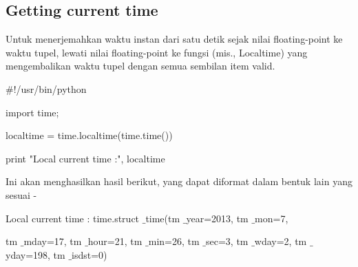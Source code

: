 \documentclass[a4paper,12pt]{report}
\begin{document}
\vspace{20pt}
\vspace{20pt}
\subsection*{Getting current time}
 \par
\begin{adjustwidth}{0.03in}{0.03in}
 \hspace*{0.5in} Untuk menerjemahkan waktu instan dari satu detik sejak nilai floating-point ke waktu tupel, lewati nilai floating-point ke fungsi (mis., Localtime) yang mengembalikan waktu tupel dengan semua sembilan item valid.\end{adjustwidth}
 \par
\vspace{12pt}
\noindent 
 \hspace*{0.5in}  $  \#  $!/usr/bin/python \par
\noindent 
 \hspace*{0.5in} import time; \par
\vspace{12pt}
\noindent 
 \hspace*{0.5in} localtime = time.localtime(time.time()) \par
\noindent 
 \hspace*{0.5in} print "Local current time :", localtime \par
\vspace{12pt}
\begin{adjustwidth}{0.03in}{0.03in}
Ini akan menghasilkan hasil berikut, yang dapat diformat dalam bentuk lain yang sesuai -\end{adjustwidth}
 \par
\noindent 
{\fontsize{9pt}{9pt}\selectfont  \hspace*{0.5in} Local current time : time.struct $  \_  $time(tm $  \_  $year=2013, tm $  \_  $mon=7, } \par
\noindent 
{\fontsize{9pt}{9pt}\selectfont  \hspace*{0.5in} tm $  \_  $mday=17, tm $  \_  $hour=21, tm $  \_  $min=26, tm $  \_  $sec=3, tm $  \_  $wday=2, tm $  \_  $yday=198, tm $  \_  $isdst=0)} \par
\vspace{9pt}
\vspace{20pt}
\vspace{12pt}
\end{document}
